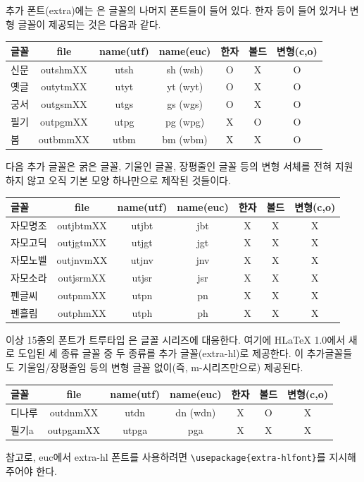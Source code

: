 추가 폰트(extra)에는 은 글꼴의 나머지 폰트들이 들어 있다. 한자 등이
들어 있거나 변형 글꼴이 제공되는 것은 다음과 같다. 

\begin{center}
\begin{tabular}{lcccccc}
\hline
글꼴 & file & name(utf) & name(euc) & 한자 & 볼드 & 변형(c,o) \\ \hline
신문 & outshmXX & utsh & sh (wsh) & O & X & O  \\
옛글 & outytmXX & utyt & yt (wyt) & O & X & O \\
궁서 & outgsmXX & utgs & gs (wgs) & O & X & O \\
필기 & outpgmXX & utpg & pg (wpg) & X & O & O \\
봄 & outbmmXX & utbm & bm (wbm) & X & X & O \\
\hline
\end{tabular}
\end{center}

다음 추가 글꼴은 굵은 글꼴, 기울인 글꼴, 장평줄인 글꼴 등의 변형 서체를
전혀 지원하지 않고 오직 기본 모양 하나만으로 제작된 것들이다.

\begin{center}
\begin{tabular}{lcccccc}
\hline
글꼴 & file & name(utf) & name(euc) & 한자 & 볼드 & 변형(c,o) \\ \hline
자모명조 & outjbtmXX & utjbt & jbt & X & X & X \\
자모고딕 & outjgtmXX & utjgt & jgt & X & X & X \\
자모노벨 & outjnvmXX & utjnv & jnv & X & X & X \\
자모소라 & outjsrmXX & utjsr & jsr & X & X & X \\
펜글씨 & outpnmXX & utpn & pn & X & X & X \\
펜흘림 & outphmXX & utph & ph & X & X & X \\
\hline
\end{tabular}
\end{center}

이상 15종의 폰트가 트루타입 은 글꼴 시리즈에 대응한다. 여기에 H\LaTeX{}
1.0에서 새로 도입된 세 종류 글꼴 중 두 종류를 추가 글꼴(extra-hl)로
제공한다. 이 추가글꼴들도 기울임/장평줄임 등의 변형 글꼴 없이(즉,
m-시리즈만으로) 제공된다. 

\begin{center}
\begin{tabular}{lcccccc}
\hline
글꼴 & file & name(utf) & name(euc) & 한자 & 볼드 & 변형(c,o) \\ \hline
디나루 & outdnmXX & utdn & dn (wdn) & X & O & X \\
필기a & outpgamXX & utpga & pga & X & X & X \\
\hline
\end{tabular}
\end{center}
\euc 참고로, euc에서 extra-hl 폰트를 사용하려면 \verb|\usepackage{extra-hlfont}|를
지시해주어야 한다. 

